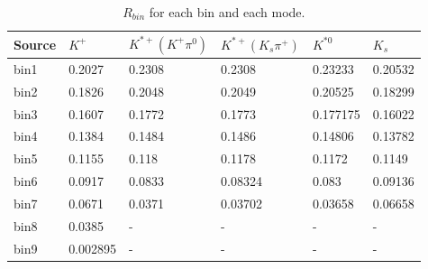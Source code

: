 \clearpage

\begin{table}[h]
\begin{center}
\begin{tabu}to \textwidth{ |X[l]|X[c]|X[c]|X[c]|X[c]|X[c]| }
\hline
Source & $K^+$ & $K^{*+}(K^+ \pi^0)$ & $K^{*+}(K_s \pi^+)$ & $K^{*0}$ & $K_s$\\ 
\hline
bin1 & 0.2027 & 0.2308 & 0.2308 &0.23233 & 0.20532\\
\hline
bin2 & 0.1826 & 0.2048 & 0.2049 &0.20525 & 0.18299 \\
\hline
bin3 & 0.1607 & 0.1772 & 0.1773 &0.177175 & 0.16022 \\
\hline
bin4 & 0.1384 & 0.1484 & 0.1486 &0.14806 & 0.13782 \\
\hline
bin5 & 0.1155 & 0.118  & 0.1178 &0.1172 & 0.1149 \\
\hline
bin6 & 0.0917 & 0.0833 & 0.08324 &0.083 & 0.09136 \\
\hline
bin7 & 0.0671 & 0.0371 & 0.03702 &0.03658 & 0.06658 \\
\hline
bin8 & 0.0385 & - & - & - & - \\
\hline
bin9 & 0.002895 & - & - & - & - \\
\hline
\end{tabu}
\caption{$R_{bin}$ for each bin and each mode.} \label{t:rbin}
\end{center}
\end{table}

